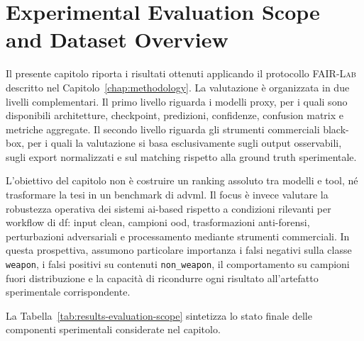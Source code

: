 \section{Experimental Evaluation Scope and Dataset Overview}
\label{sec:results-scope}

Il presente capitolo riporta i risultati ottenuti applicando il protocollo
\textsc{FAIR-Lab} descritto nel Capitolo~\ref{chap:methodology}. La valutazione
è organizzata in due livelli complementari. Il primo livello riguarda i modelli
proxy, per i quali sono disponibili architetture, checkpoint, predizioni,
confidenze, confusion matrix e metriche aggregate. Il secondo livello riguarda
gli strumenti commerciali black-box, per i quali la valutazione si basa
esclusivamente sugli output osservabili, sugli export normalizzati e sul matching
rispetto alla ground truth sperimentale.

L'obiettivo del capitolo non è costruire un ranking assoluto tra modelli e tool,
né trasformare la tesi in un benchmark di \gls{advml}. Il focus è invece
valutare la robustezza operativa dei sistemi \gls{ai}-based rispetto a condizioni
rilevanti per workflow di \gls{df}: input clean, campioni \gls{ood},
trasformazioni anti-forensi, perturbazioni adversariali e processamento mediante
strumenti commerciali. In questa prospettiva, assumono particolare importanza i
falsi negativi sulla classe \texttt{weapon}, i falsi positivi su contenuti
\texttt{non\_weapon}, il comportamento su campioni fuori distribuzione e la
capacità di ricondurre ogni risultato all'artefatto sperimentale corrispondente.

La Tabella~\ref{tab:results-evaluation-scope} sintetizza lo stato finale delle
componenti sperimentali considerate nel capitolo.

